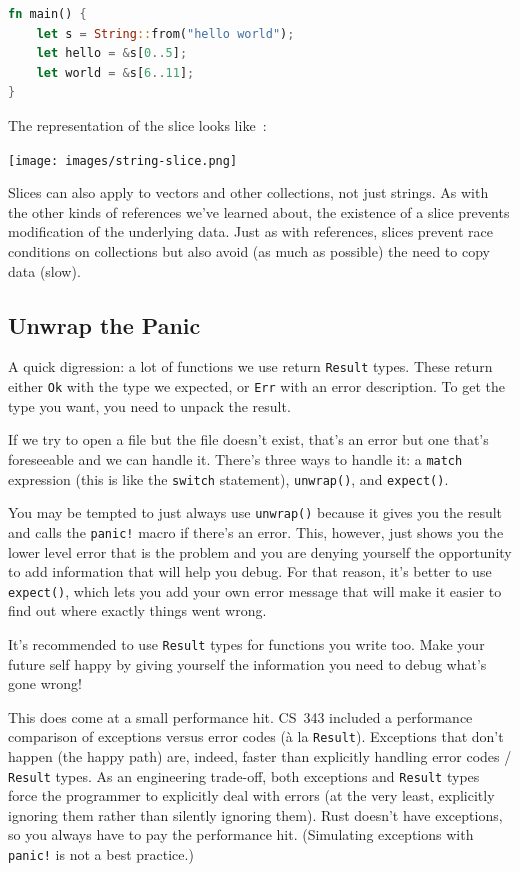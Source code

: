 \documentclass[a4paper]{report}
\begin{document}
\begin{lstlisting}[language=Rust]
fn main() {
    let s = String::from("hello world");
    let hello = &s[0..5];
    let world = &s[6..11];
}
\end{lstlisting}

The representation of the slice looks like~\cite{rustdocs}:
\begin{center}
	\texttt{[image: images/string-slice.png]}
\end{center}

Slices can also apply to vectors and other collections, not just strings. As with the other kinds of references we've learned about, the existence of a slice prevents modification of the underlying data. Just as with references, slices prevent race conditions on collections but also avoid (as much as possible) the need to copy data (slow).

\subsection*{Unwrap the Panic}
A quick digression: a lot of functions we use return \texttt{Result} types. These return either \texttt{Ok} with the type we expected, or \texttt{Err} with an error description. To get the type you want, you need to unpack the result.

If we try to open a file but the file doesn't exist, that's an error but one that's foreseeable and we can handle it. There's three ways to handle it: a \texttt{match} expression (this is like the \texttt{switch} statement), \texttt{unwrap()}, and \texttt{expect()}. 

You may be tempted to just always use \texttt{unwrap()} because it gives you the result and calls the \texttt{panic!} macro if there's an error. This, however, just shows you the lower level error that is the problem and you are denying yourself the opportunity to add information that will help you debug. For that reason, it's better to use \texttt{expect()}, which lets you add your own error message that will make it easier to find out where exactly things went wrong.

It's recommended to use \texttt{Result} types for functions you write too. Make your future self happy by giving yourself the information you need to debug what's gone wrong!

This does come at a small performance hit. CS~343 included a performance comparison of exceptions versus error codes (\`a la \texttt{Result}). Exceptions that don't happen (the happy path) are, indeed, faster than explicitly handling error codes / \texttt{Result} types. As an engineering trade-off, both exceptions and \texttt{Result} types force the programmer to explicitly deal with errors (at the very least, explicitly ignoring them rather than silently ignoring them). Rust doesn't have exceptions, so you always have to pay the performance hit. (Simulating exceptions with \texttt{panic!} is not a best practice.)
\end{document}
